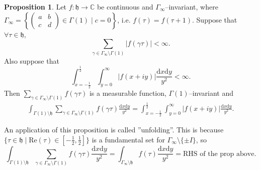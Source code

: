 \documentclass{article}
\theoremstyle{definition}
\newtheorem{prop}[theorem]{Proposition}
\begin{document}
\begin{prop}
    Let $f : \mathfrak{h} \to \mathbb{C}$ be continuous and $\Gamma_{\infty}$--invariant, where $\Gamma_{\infty} = \left\{\begin{pmatrix} a & b \\ c & d  \end{pmatrix} \in \Gamma(1) \mid c = 0\right\}$, i.e. $f(\tau)=f(\tau+1)$. Suppose that $\forall \tau \in \mathfrak{h}$, $$\sum_{\gamma \in \Gamma_\infty \setminus \Gamma(1)} |f(\gamma \tau)| < \infty.$$
    Also suppose that $$\int_{x=-\frac{1}{2}}^{\frac{1}{2}} \int_{y=0}^{\infty} |f(x+iy)|\frac{\mathrm{d}x\mathrm{d}y}{y^2} < \infty.$$
    Then $\sum_{\gamma \in \Gamma_\infty\setminus \Gamma(1)}^{} f(\gamma \tau)$ is a measurable function, $\Gamma(1)$--invariant and 
    \begin{align*}
        \int_{\Gamma(1)\setminus \mathfrak{h}}^{} \sum_{\gamma \in \Gamma_\infty \setminus \Gamma(1)}^{} f(\gamma \tau)\frac{\mathrm{d}x\mathrm{d}y}{y^2} = \int_{x=-\frac{1}{2}}^{\frac{1}{2}} \int_{y=0}^{\infty} |f(x+iy)|\frac{\mathrm{d}x\mathrm{d}y}{y^2}.
    \end{align*}
\end{prop}
An application of this proposition is called ''unfolding''. This is because $\{\tau \in \mathfrak{h}\mid \text{Re}(\tau) \in [-\frac{1}{2},\frac{1}{2}]\}$ is a fundamental set for $\Gamma_{\infty}\setminus \{\pm I\}$, so \[
\int_{\Gamma(1)\setminus \mathfrak{h}}^{} \sum_{\gamma \in \Gamma_{\infty}\setminus \Gamma(1)}^{} f(\gamma \tau) \frac{\mathrm{d}x\mathrm{d}y}{y^2} = \int_{\Gamma_{\infty}\setminus \mathfrak{h}}^{} f(\tau)\frac{\mathrm{d}x\mathrm{d}y}{y^2} = \text{RHS of the prop above}.
\]
\end{document}

